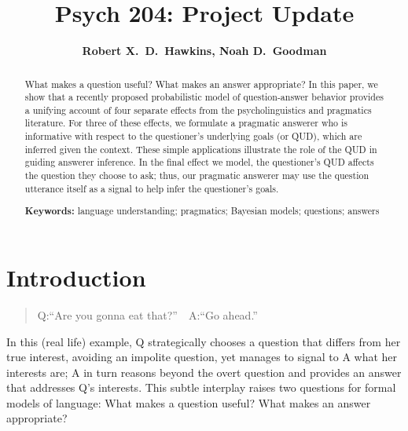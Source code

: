 \documentclass[10pt,letterpaper]{article}
\title{Psych 204: Project Update}
\author{{\large \bf Robert X.~D.~Hawkins, Noah D.~Goodman}}
\newcommand{\red}[1]{\textcolor{Red}{#1}}
\begin{document}
\maketitle

\begin{abstract}
What makes a question useful? What makes an answer appropriate? In this paper, we show that a recently proposed probabilistic model of question-answer behavior provides a unifying account of four separate effects from the psycholinguistics and pragmatics literature. For three of these effects, we formulate a pragmatic answerer who is  informative with respect to the questioner's underlying goals (or QUD), which are inferred given the context. These simple applications illustrate the role of the QUD in guiding answerer inference. In the final effect we model, the questioner's QUD affects the question they choose to ask; thus, our pragmatic answerer may use the question utterance itself as a signal to help infer the questioner's goals. 

\textbf{Keywords:} 
language understanding; pragmatics; Bayesian models; questions; answers
\end{abstract}

\section{Introduction}
\label{sec:intro}


\begin{quote}
Q:``Are you gonna eat that?''\ \ A:``Go ahead.''
\end{quote}
In this (real life) example, Q strategically chooses a question that differs from her true interest, avoiding an impolite question, yet manages to signal to A what her interests are; A in turn reasons beyond the overt question and provides an answer that addresses Q's interests.
This subtle interplay raises two questions for formal models of language:
What makes a question useful? What makes an answer appropriate? 
\end{document}

